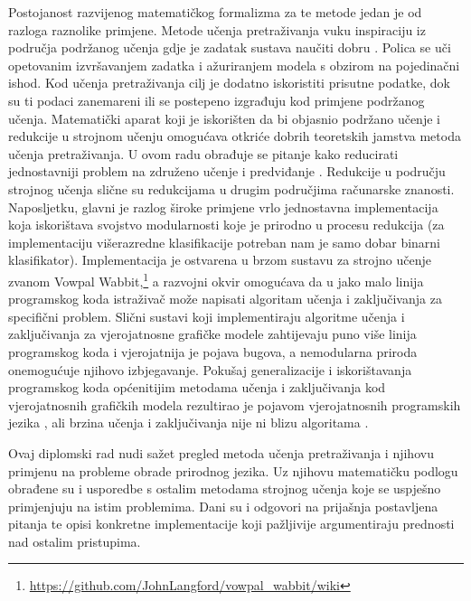 Postojanost razvijenog matematičkog formalizma za te metode jedan je od razloga
raznolike primjene. Metode učenja pretraživanja vuku inspiraciju iz područja
podržanog učenja  gdje je zadatak sustava naučiti
dobru .
Polica se uči opetovanim izvršavanjem zadatka i ažuriranjem modela s obzirom na
pojedinačni ishod. Kod učenja pretraživanja cilj je dodatno iskoristiti prisutne
podatke, dok su ti podaci zanemareni ili se postepeno izgrađuju kod primjene
podržanog učenja. Matematički aparat koji je iskorišten da bi objasnio podržano
učenje i redukcije u strojnom učenju 
omogućava otkriće dobrih teoretskih jamstva metoda učenja pretraživanja. U ovom
radu obrađuje se pitanje kako reducirati jednostavniji problem na združeno
učenje i predviđanje . Redukcije u području
strojnog učenja slične su redukcijama u drugim područjima računarske znanosti.
Naposljetku, glavni je razlog široke primjene vrlo jednostavna implementacija
koja iskorištava svojstvo modularnosti koje je prirodno u procesu redukcija (za
implementaciju višerazredne klasifikacije potreban nam je samo dobar binarni
klasifikator). Implementacija je ostvarena u brzom sustavu za strojno učenje
zvanom Vowpal
Wabbit,\footnote{\url{https://github.com/JohnLangford/vowpal_wabbit/wiki}} a
\lts{} razvojni okvir omogućava da u jako malo linija programskog koda
istraživač može napisati algoritam učenja i zaključivanja za specifični problem.
Slični sustavi koji implementiraju algoritme učenja i zaključivanja za
vjerojatnosne grafičke modele zahtijevaju puno više linija programskog koda i
vjerojatnija je pojava bugova, a nemodularna priroda onemogućuje njihovo
izbjegavanje. Pokušaj generalizacije i iskorištavanja programskog koda
općenitijim metodama učenja i zaključivanja kod vjerojatnosnih grafičkih modela
rezultirao je pojavom vjerojatnosnih programskih jezika , ali brzina učenja i zaključivanja nije ni blizu
algoritama \lts{}.

Ovaj diplomski rad nudi sažet pregled metoda učenja pretraživanja i njihovu
primjenu na probleme obrade prirodnog jezika. Uz njihovu matematičku podlogu
obrađene su i usporedbe s ostalim metodama strojnog učenja koje se uspješno
primjenjuju na istim problemima. Dani su i odgovori na prijašnja postavljena
pitanja te opisi konkretne implementacije koji pažljivije argumentiraju
prednosti nad ostalim pristupima.

